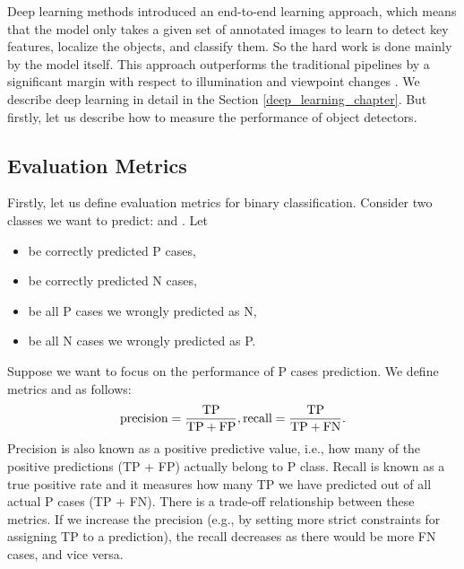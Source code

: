 Deep learning methods introduced an end-to-end learning approach, which means that the model only takes a given set of annotated images to learn to detect key features, localize the objects, and classify them. So the hard work is done mainly by the model itself. This approach outperforms the traditional pipelines by a significant margin with respect to illumination and viewpoint changes \cite{outperforming}. We describe deep learning in detail in the Section \ref{deep_learning_chapter}. But firstly, let us describe how to measure the performance of object detectors.


\subsection{Evaluation Metrics}
Firstly, let us define evaluation metrics for binary classification. Consider two classes we want to predict:  and . Let
\begin{itemize}
    \item {} be correctly predicted P cases,
    \item {} be correctly predicted N cases,
    \item {} be all P cases we wrongly predicted as N,
    \item {} be all N cases we wrongly predicted as P.
\end{itemize}
Suppose we want to focus on the performance of P cases prediction. We define metrics  and  as follows:
$$
    \text{precision} = \frac{\text{TP}}{\text{TP} + \text{FP}}, \\
    \text{recall} = \frac{\text{TP}}{\text{TP} + \text{FN}}.
$$
Precision is also known as a positive predictive value, i.e., how many of the positive predictions (TP + FP) actually belong to P class. Recall is known as a true positive rate and it measures how many TP we have predicted out of all actual P cases (TP + FN). There is a trade-off relationship between these metrics. If we increase the precision (e.g., by setting more strict constraints for assigning TP to a prediction), the recall decreases as there would be more FN cases, and vice versa. 


